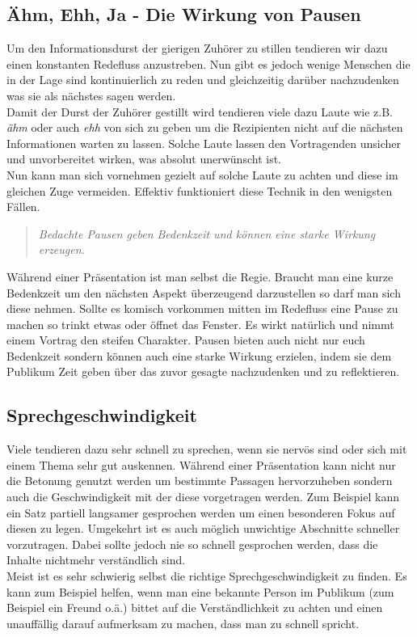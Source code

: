 \documentclass[../main.tex]{subfiles}
\begin{document}
        \subsection[Pausen]{Ähm, Ehh, Ja - Die Wirkung von Pausen}
            Um den Informationsdurst der gierigen Zuhörer zu stillen tendieren wir dazu einen konstanten Redefluss anzustreben. Nun gibt es jedoch wenige Menschen die in der Lage sind kontinuierlich zu reden und gleichzeitig darüber nachzudenken was sie als nächstes sagen werden.\\
            Damit der Durst der Zuhörer gestillt wird tendieren viele dazu Laute wie z.B. \emph{ähm} oder auch \emph{ehh} von sich zu geben um die Rezipienten nicht auf die nächsten Informationen warten zu lassen. Solche Laute lassen den Vortragenden unsicher und unvorbereitet wirken, was absolut unerwünscht ist.\\
            Nun kann man sich vornehmen gezielt auf solche Laute zu achten und diese im gleichen Zuge vermeiden. Effektiv funktioniert diese Technik in den wenigsten Fällen.
            \begin{quote}
                \emph{Bedachte Pausen geben Bedenkzeit und können eine starke Wirkung erzeugen.}
            \end{quote}
            Während einer Präsentation ist man selbst die Regie. Braucht man eine kurze Bedenkzeit um den nächsten Aspekt überzeugend darzustellen so darf man sich diese nehmen. Sollte es komisch vorkommen mitten im Redefluss eine Pause zu machen so trinkt etwas oder öffnet das Fenster. Es wirkt natürlich und nimmt einem Vortrag den steifen Charakter. Pausen bieten auch nicht nur euch Bedenkzeit sondern können auch eine starke Wirkung erzielen, indem sie dem Publikum Zeit geben über das zuvor gesagte nachzudenken und zu reflektieren.
            
        \subsection{Sprechgeschwindigkeit}
        	Viele tendieren dazu sehr schnell zu sprechen, wenn sie nervös sind oder sich mit einem Thema sehr gut auskennen. Während einer Präsentation kann nicht nur die Betonung genutzt werden um bestimmte Passagen hervorzuheben sondern auch die Geschwindigkeit mit der diese vorgetragen werden. Zum Beispiel kann ein Satz partiell langsamer gesprochen werden um einen besonderen Fokus auf diesen zu legen. Umgekehrt ist es auch möglich unwichtige Abschnitte schneller vorzutragen. Dabei sollte jedoch nie so schnell gesprochen werden, dass die Inhalte nichtmehr verständlich sind.\\
        	Meist ist es sehr schwierig selbst die richtige Sprechgeschwindigkeit zu finden. Es kann zum Beispiel helfen, wenn man eine bekannte Person im Publikum (zum Beispiel ein Freund o.ä.) bittet auf die Verständlichkeit zu achten und einen unauffällig darauf aufmerksam zu machen, dass man zu schnell spricht. 
        
\end{document}
